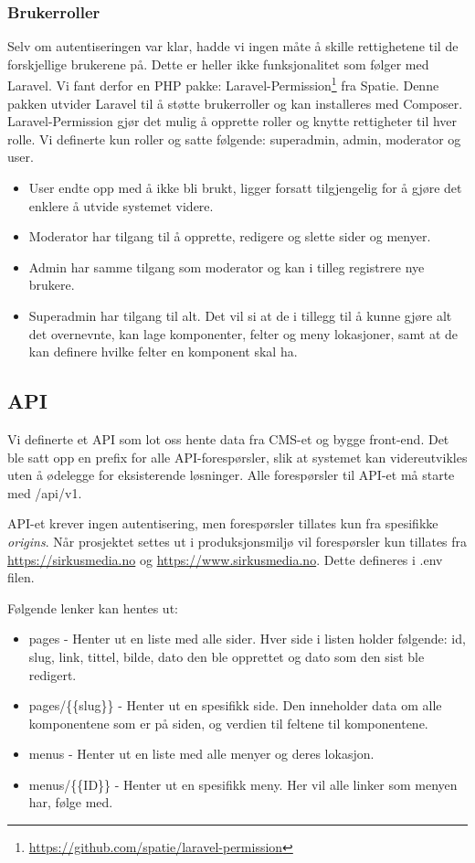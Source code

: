 \subsubsection{Brukerroller}
Selv om autentiseringen var klar, hadde vi ingen måte å skille rettighetene til de forskjellige brukerene på. Dette er heller ikke funksjonalitet som følger med Laravel. Vi fant derfor en PHP pakke: Laravel-Permission\footnote{\url{https://github.com/spatie/laravel-permission}} fra Spatie. Denne pakken utvider Laravel til å støtte brukerroller og kan installeres med Composer. Laravel-Permission gjør det mulig å opprette roller og knytte rettigheter til hver rolle. Vi definerte kun roller og satte følgende: superadmin, admin, moderator og user.
\begin{itemize}
    \item User endte opp med å ikke bli brukt, ligger forsatt tilgjengelig for å gjøre det enklere å utvide systemet videre.
    \item Moderator har tilgang til å opprette, redigere og slette sider og menyer.
    \item Admin har samme tilgang som moderator og kan i tilleg registrere nye brukere.
    \item Superadmin har tilgang til alt. Det vil si at de i tillegg til å kunne gjøre alt det overnevnte, kan lage komponenter, felter og meny lokasjoner, samt at de kan definere hvilke felter en komponent skal ha.
\end{itemize}


\subsection{API}
Vi definerte et API som lot oss hente data fra CMS-et og bygge front-end. Det ble satt opp en prefix for alle API-forespørsler, slik at systemet kan videreutvikles uten å ødelegge for eksisterende løsninger. Alle forespørsler til API-et må starte med /api/v1.

API-et krever ingen autentisering, men forespørsler tillates kun fra spesifikke \textit{origins}. Når prosjektet settes ut i produksjonsmiljø vil forespørsler kun tillates fra \url{https://sirkusmedia.no} og \url{https://www.sirkusmedia.no}. Dette defineres i .env filen.

Følgende lenker kan hentes ut:
\begin{itemize}
  \item pages - Henter ut en liste med alle sider. Hver side i listen holder følgende: id, slug, link, tittel, bilde, dato den ble opprettet og dato som den sist ble redigert.
  \item pages/\{\{slug\}\} - Henter ut en spesifikk side. Den inneholder data om alle komponentene som er på siden, og verdien til feltene til komponentene.
  \item menus - Henter ut en liste med alle menyer og deres lokasjon.
  \item menus/\{\{ID\}\} - Henter ut en spesifikk meny. Her vil alle linker som menyen har, følge med.
\end{itemize}

